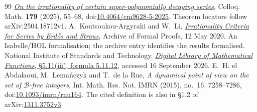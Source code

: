 \documentclass[11pt]{article}
\begin{document}
\begin{thebibliography}{99}
  \href{https://arxiv.org/abs/2504.18712v1}
  {\emph{On the irrationality of certain super-polynomially decaying series}},
  Colloq. Math. \textbf{179} (2025), 55--68,
  doi:\href{https://doi.org/10.4064/cm9628-5-2025}{10.4064/cm9628-5-2025}.
  Theorem locators follow arXiv:2504.18712v1.
 A.~Koutsoukou-Argyraki and W.~Li,
  \href{https://isa-afp.org/entries/Irrational_Series_Erdos_Straus.html}
  {\emph{Irrationality Criteria for Series by Erd\H{o}s and Straus}},
  Archive of Formal Proofs, 12 May 2020. An Isabelle/HOL formalisation;
  the archive entry identifies the results formalised.
 National Institute of Standards and Technology,
  \href{https://dlmf.nist.gov/5.11.E12}{\emph{Digital Library of Mathematical
  Functions}, \S5.11(iii), formula 5.11.12}, accessed 16 September 2026.
 E.~H. el Abdalaoui, M.~Lema\'nczyk and T.~de la Rue,
  \emph{A dynamical point of view on the set of $\mathcal B$-free integers},
  Int. Math. Res. Not. IMRN (2015), no.~16, 7258--7286,
  doi:\href{https://doi.org/10.1093/imrn/rnu164}{10.1093/imrn/rnu164}.
  The cited definition is also in \S1.2 of
  arXiv:\href{https://arxiv.org/abs/1311.3752v3}{1311.3752v3}.
\end{thebibliography}
\end{document}
